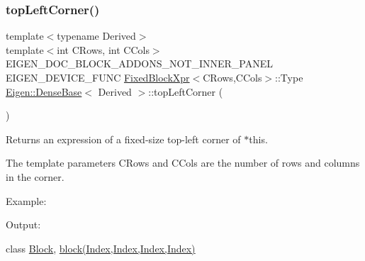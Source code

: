 \subsubsection{\texorpdfstring{topLeftCorner()}{topLeftCorner()}\hspace{0.1cm}{\footnotesize\ttfamily [2/3]}}
{\footnotesize\ttfamily template$<$typename Derived$>$ \\
template$<$int C\+Rows, int C\+Cols$>$ \\
E\+I\+G\+E\+N\+\_\+\+D\+O\+C\+\_\+\+B\+L\+O\+C\+K\+\_\+\+A\+D\+D\+O\+N\+S\+\_\+\+N\+O\+T\+\_\+\+I\+N\+N\+E\+R\+\_\+\+P\+A\+N\+EL E\+I\+G\+E\+N\+\_\+\+D\+E\+V\+I\+C\+E\+\_\+\+F\+U\+NC \mbox{\hyperlink{struct_eigen_1_1_dense_base_1_1_fixed_block_xpr}{Fixed\+Block\+Xpr}}$<$C\+Rows,C\+Cols$>$\+::Type \mbox{\hyperlink{class_eigen_1_1_dense_base}{Eigen\+::\+Dense\+Base}}$<$ Derived $>$\+::top\+Left\+Corner (\begin{DoxyParamCaption}{ }\end{DoxyParamCaption})\hspace{0.3cm}{\ttfamily [inline]}}

\begin{DoxyReturn}{Returns}
an expression of a fixed-\/size top-\/left corner of $\ast$this.
\end{DoxyReturn}
The template parameters C\+Rows and C\+Cols are the number of rows and columns in the corner.

Example\+: 
\begin{DoxyCodeInclude}{0}
\end{DoxyCodeInclude}
 Output\+: 
\begin{DoxyVerbInclude}
\end{DoxyVerbInclude}
 class \mbox{\hyperlink{class_eigen_1_1_block}{Block}}, \mbox{\hyperlink{class_eigen_1_1_dense_base_ab8e42e67c5cfd5fa13e684642f0f65bf}{block(\+Index,\+Index,\+Index,\+Index)}} \mbox{\label{class_eigen_1_1_dense_base_aa70d0b21877ab8a5992ab103786b788e}} 
